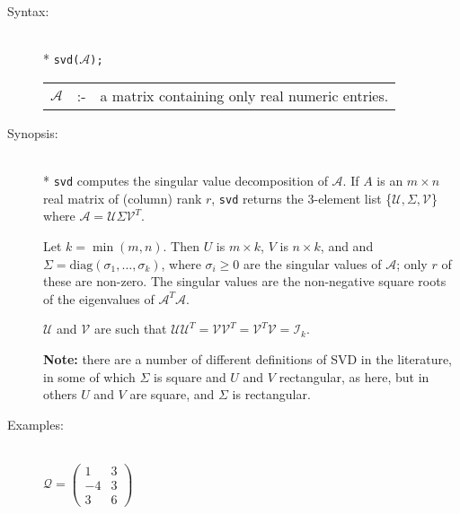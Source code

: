 \begin{description}
\item[Syntax:]\mbox{}\\*
\texttt{svd($\mathcal{A}$);}\\[2mm]
\begin{tabular}{l l l}
$\mathcal{A}$ &:-& a matrix containing only real numeric entries.
\end{tabular}

\item[Synopsis:]\mbox{}\\*
\texttt{svd} computes the singular value decomposition of $\mathcal{A}$.
If $A$
is an $m\times n$ real matrix of (column) rank $r$, \texttt{svd} returns the
3-element list \{$\mathcal{U},\Sigma,\mathcal{V}$\} where $\mathcal{A} =
\mathcal{U} \Sigma \mathcal{V}^T$.

Let $k=\min(m,n)$.  Then $U$ is $m\times k$,
$V$ is $n\times k$, and and $\Sigma = \mbox{diag}(\sigma_{1}, \ldots ,\sigma_{k})$,
where $\sigma_{i}\ge 0$ are the singular values of $\mathcal{A}$; only $r$ of
these are non-zero.  The singular values are the non-negative square roots of
the eigenvalues of $\mathcal{A}^T \mathcal{A}$.

$\mathcal{U}$ and $\mathcal{V}$ are such that $\mathcal{UU}^T = \mathcal{VV}^T =
\mathcal{V}^T \mathcal{V} = \mathcal{I}_k$.

\textbf{Note:} there are a number of different definitions of SVD in the
literature, in some of which $\Sigma$ is square and $U$ and $V$ rectangular, as
here, but in others $U$ and $V$ are square, and $\Sigma$ is rectangular.

\item[Examples:]\mbox{}\\
  \( \mathcal{Q} = \begin{pmatrix} 1 & 3 \\ -4 & 3 \\ 3 & 6 \end{pmatrix}\)


\end{description}
